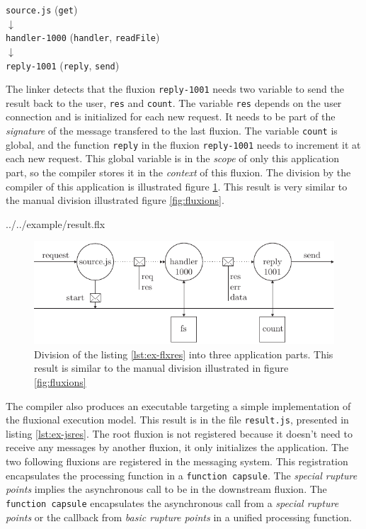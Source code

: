\begin{center}
\texttt{source.js} (\texttt{get})\\
$\downarrow$\\
\texttt{handler-1000} (\texttt{handler}, \texttt{readFile})\\
$\downarrow$\\
\texttt{reply-1001} (\texttt{reply}, \texttt{send})
\end{center}

The linker detects that the fluxion \texttt{reply-1001} needs two variable to send the result back to the user, \texttt{res} and \texttt{count}.
The variable \texttt{res} depends on the user connection and is initialized for each new request.
It needs to be part of the \textit{signature} of the message transfered to the last fluxion.
The variable \texttt{count} is global, and the function \texttt{reply} in the fluxion \texttt{reply-1001} needs to increment it at each new request.
This global variable is in the \textit{scope} of only this application part, so the compiler stores it in the \textit{context} of this fluxion.
The division by the compiler of this application is illustrated figure \ref{fig:flux-3}.
This result is very similar to the manual division illustrated figure \ref{fig:fluxions}.

{../../example/result.flx}

\begin{figure}[h!]
\begin{center}
  \includegraphics[width=\linewidth]{ressources/flux-3.pdf}
  \caption{Division of the listing \ref{lst:ex-flxres} into three application parts. This result is similar to the manual division illustrated in figure \ref{fig:fluxions}}
  \label{fig:flux-3}
\end{center}
\end{figure}

The compiler also produces an executable targeting a simple implementation of the fluxional execution model.
This result is in the file \texttt{result.js}, presented in listing \ref{lst:ex-jsres}.
The root fluxion is not registered because it doesn't need to receive any messages by another fluxion, it only initializes the application.
The two following fluxions are registered in the messaging system.
This registration encapsulates the processing function in a \texttt{function capsule}.
The \textit{special rupture points} implies the asynchronous call to be in the downstream fluxion.
The \texttt{function capsule} encapsulates the asynchronous call from a \textit{special rupture points} or the callback from \textit{basic rupture points} in a unified processing function.

